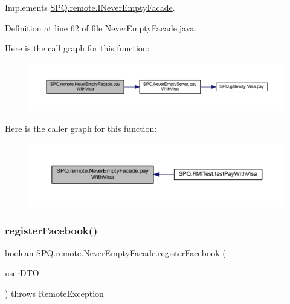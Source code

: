 Implements \mbox{\hyperlink{interface_s_p_q_1_1remote_1_1_i_never_empty_facade_a3b7058d95e7b73bdcc09220ecfc2d744}{S\+P\+Q.\+remote.\+I\+Never\+Empty\+Facade}}.



Definition at line 62 of file Never\+Empty\+Facade.\+java.

Here is the call graph for this function\+:\nopagebreak
\begin{figure}[H]
\begin{center}
\leavevmode
\includegraphics[width=350pt]{class_s_p_q_1_1remote_1_1_never_empty_facade_a0ff9201cf33cb76c43dd85c892af93ba_cgraph}
\end{center}
\end{figure}
Here is the caller graph for this function\+:\nopagebreak
\begin{figure}[H]
\begin{center}
\leavevmode
\includegraphics[width=350pt]{class_s_p_q_1_1remote_1_1_never_empty_facade_a0ff9201cf33cb76c43dd85c892af93ba_icgraph}
\end{center}
\end{figure}
\mbox{\label{class_s_p_q_1_1remote_1_1_never_empty_facade_aa9845001ecd5228135d64415a4c12b20}} 
\subsubsection{\texorpdfstring{register\+Facebook()}{registerFacebook()}}
{\footnotesize\ttfamily boolean S\+P\+Q.\+remote.\+Never\+Empty\+Facade.\+register\+Facebook (\begin{DoxyParamCaption}\item[{\mbox{\hyperlink{class_s_p_q_1_1dto_1_1_user_d_t_o}{User\+D\+TO}}}]{user\+D\+TO }\end{DoxyParamCaption}) throws Remote\+Exception}



